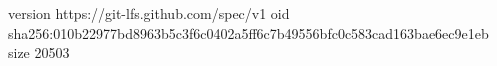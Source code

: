 version https://git-lfs.github.com/spec/v1
oid sha256:010b22977bd8963b5c3f6c0402a5ff6c7b49556bfc0c583cad163bae6ec9e1eb
size 20503
